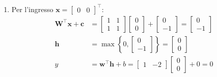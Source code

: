 ﻿\documentclass[11pt, a4paper]{article}
\begin{document}
\begin{enumerate}
    \item Per l'ingresso $\bm{x} = \begin{bmatrix} 0 & 0 \end{bmatrix}^\top$:
    \begin{align*}
    \bm{W}^\top \bm{x} + \bm{c} &= \begin{bmatrix} 1 & 1 \\ 1 & 1 \end{bmatrix} \begin{bmatrix} 0 \\ 0 \end{bmatrix} + \begin{bmatrix} 0 \\ -1 \end{bmatrix} = \begin{bmatrix} 0 \\ -1 \end{bmatrix} \\
    \bm{h} &= \max\left\{0, \begin{bmatrix} 0 \\ -1 \end{bmatrix}\right\} = \begin{bmatrix} 0 \\ 0 \end{bmatrix} \\
    y &= \bm{w}^\top \bm{h} + b = \begin{bmatrix} 1 & -2 \end{bmatrix} \begin{bmatrix} 0 \\ 0 \end{bmatrix} + 0 = \boxed{0}
    \end{align*}


\end{enumerate}
\end{document}
